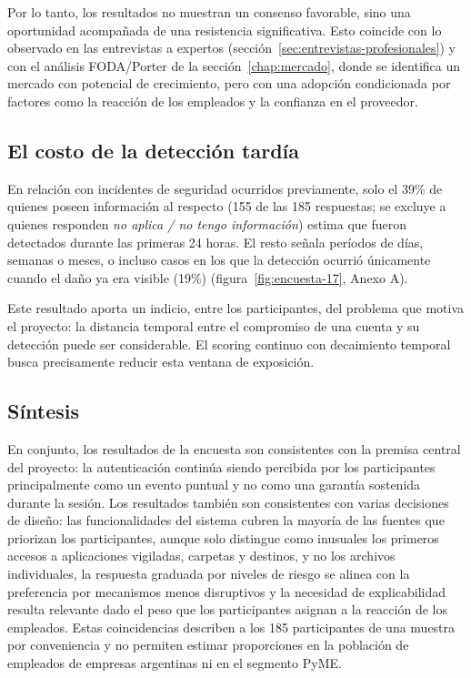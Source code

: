 Por lo tanto, los resultados no muestran un consenso favorable, sino una oportunidad acompañada de una resistencia significativa. Esto coincide con lo observado en las entrevistas a expertos (sección~\ref{sec:entrevistas-profesionales}) y con el análisis FODA/Porter de la sección~\ref{chap:mercado}, donde se identifica un mercado con potencial de crecimiento, pero con una adopción condicionada por factores como la reacción de los empleados y la confianza en el proveedor.

\subsection{El costo de la detección tardía}

En relación con incidentes de seguridad ocurridos previamente, solo el 39\% de quienes poseen información al respecto (155 de las 185 respuestas; se excluye a quienes responden \emph{no aplica / no tengo información}) estima que fueron detectados durante las primeras 24 horas. El resto señala períodos de días, semanas o meses, o incluso casos en los que la detección ocurrió únicamente cuando el daño ya era visible (19\%) (figura~\ref{fig:encuesta-17}, Anexo A).

Este resultado aporta un indicio, entre los participantes, del problema que motiva el proyecto: la distancia temporal entre el compromiso de una cuenta y su detección puede ser considerable. El scoring continuo con decaimiento temporal busca precisamente reducir esta ventana de exposición.

\subsection{Síntesis}

En conjunto, los resultados de la encuesta son consistentes con la premisa central del proyecto: la autenticación continúa siendo percibida por los participantes principalmente como un evento puntual y no como una garantía sostenida durante la sesión. Los resultados también son consistentes con varias decisiones de diseño: las funcionalidades del sistema cubren la mayoría de las fuentes que priorizan los participantes, aunque solo distingue como inusuales los primeros accesos a aplicaciones vigiladas, carpetas y destinos, y no los archivos individuales, la respuesta graduada por niveles de riesgo se alinea con la preferencia por mecanismos menos disruptivos y la necesidad de explicabilidad resulta relevante dado el peso que los participantes asignan a la reacción de los empleados. Estas coincidencias describen a los 185 participantes de una muestra por conveniencia y no permiten estimar proporciones en la población de empleados de empresas argentinas ni en el segmento PyME.

